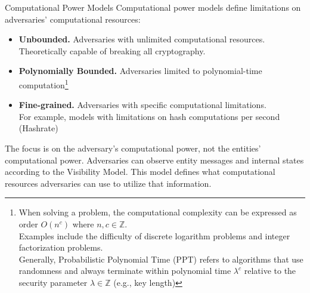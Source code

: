 \documentclass[aspectratio=169,10pt]{beamer}
\newenvironment{outlineblock}[1][]
{\begin{tcolorbox}[colframe=black, colback=white, boxrule=1pt, boxsep=5pt]}
{\end{tcolorbox}}
\begin{document}
\begin{frame}{Computational Power Models}
Computational power models define limitations on adversaries' computational resources:


\begin{itemize}
    \item \textbf{Unbounded. }Adversaries with unlimited computational resources. Theoretically capable of breaking all cryptography.\\
    
    \item \textbf{Polynomially Bounded. }Adversaries limited to polynomial-time computation\footnote{
    When solving a problem, the computational complexity can be expressed as order $O(n^c)$ where $n, c \in \mathbb{Z}$.\\
    Examples include the difficulty of discrete logarithm problems and integer factorization problems.\\
    Generally, Probabilistic Polynomial Time (PPT) refers to algorithms that use randomness and always terminate within polynomial time $\lambda^c$ relative to the security parameter $\lambda \in \mathbb{Z}$ (e.g., key length)}
    
    \item \textbf{Fine-grained. }Adversaries with specific computational limitations.\\
    For example, models with limitations on hash computations per second (Hashrate)
\end{itemize}

\vspace{0.5em}

\begin{outlineblock}[]
The focus is on the adversary's computational power, not the entities' computational power.
Adversaries can observe entity messages and internal states according to the Visibility Model. This model defines what computational resources adversaries can use to utilize that information.
\end{outlineblock}
\end{frame}
\end{document}
